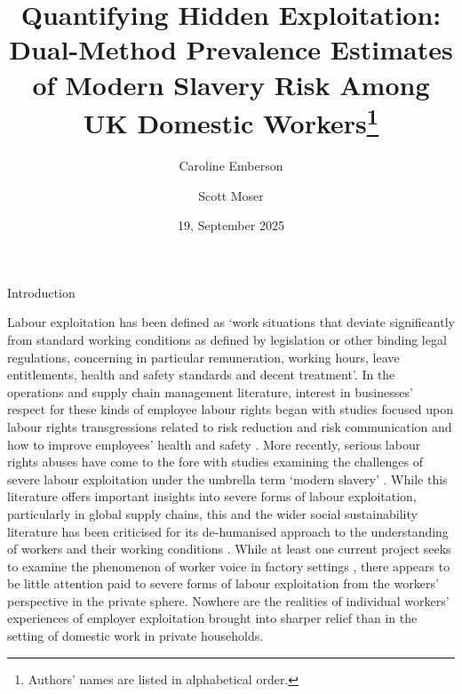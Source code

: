 \documentclass[
  12pt,
  letterpaper,
  DIV=11,
  numbers=noendperiod]{scrartcl}
\title{Quantifying Hidden Exploitation: Dual-Method Prevalence Estimates
of Modern Slavery Risk Among UK Domestic Workers\footnote{Authors' names
  are listed in alphabetical order.}}
\author{Caroline Emberson \and Scott Moser}
\date{19, September 2025}
\theoremstyle{plain}
\theoremstyle{definition}
\renewcommand*\contentsname{Table of contents}
\newcommand\contentsname{Table of contents}
\begin{document}
\maketitle

\renewcommand*\contentsname{Table of contents}
{
\hypersetup{linkcolor=}
\setcounter{tocdepth}{3}
\tableofcontents
}

\newpage

Introduction

Labour exploitation has been defined as `work situations that deviate 
significantly from standard working conditions as defined by legislation
or other binding legal regulations, concerning in particular
remuneration, working hours, leave entitlements, health and safety
standards and decent treatment'\autocite[10]{european_union_for_fundamental_rights_severe_2015}. In the operations and supply chain management literature,
interest in businesses' respect for these kinds of employee labour rights began with
studies focused upon labour rights transgressions related to risk
reduction and risk communication and how to improve
employees' health and safety \autocite{chinander_aligning_2001,wolf_operationalizing_2001}. More recently, 
serious labour rights abuses have come to the fore with studies
examining the challenges of severe labour exploitation under the umbrella term `modern slavery' \autocite{gold_modern_2015,new_modern_2015,benstead_horizontal_2018,stevenson_modern_2018}. While this literature
offers important insights into severe forms of labour exploitation, particularly
in global supply chains, this and the wider social sustainability literature has
been criticised for its de-humanised approach to the understanding
of workers and their working conditions \autocite{soundararajan_humanizing_2021}. While at least one current
project seeks to examine the phenomenon of worker voice in factory
settings  \autocite{leverhulme_trust_research_2022}, there appears to be little attention paid to severe forms of labour exploitation from the workers' perspective in the private sphere. Nowhere are the realities of individual workers' experiences of employer exploitation brought into sharper relief than in the setting of domestic
work in private households.
\end{document}
